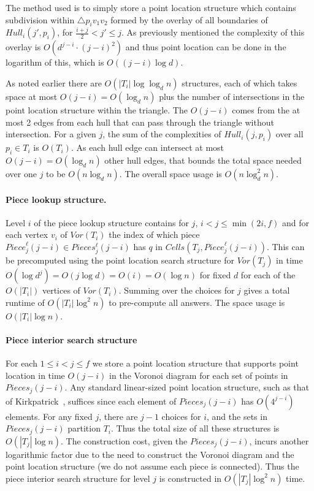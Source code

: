 \documentclass[10pt,a4paper]{amsart}
\newcommand{\Cells}{\mathit{Cells}}
\newcommand{\Piece}{\mathit{Piece}}
\newcommand{\Pieces}{\mathit{Pieces}}
\newcommand{\Hull}{\mathit{Hull}}
\newcommand{\Voron}{\mathit{Vor}}
\begin{document}
The method used is to simply store a point location structure which contains subdivision within $\triangle p_iv_1v_2$ formed by the overlay of all boundaries of $\Hull_i(j',p_i)$, for $\frac{i+j}{2}< j'\leq j$. As previously mentioned the complexity of this overlay is $O(d^{j-i}\cdot(j-i)^{2})$ and thus point location can be done in the logarithm of this, which is $O((j-i)\log d)$.

 As noted earlier there are $O(|T_i| \log \log_d n)$ structures, each of which takes space at most $O(j-i)=O(\log_d n)$ plus the number of intersections in the point location structure within the triangle. The $O(j-i)$ comes from the at most 2 edges from each hull that can pass through the triangle without intersection.  For a given $j$, the sum of the complexities of $\Hull_i(j,p_i)$ over all $p_i \in T_i$ is $O(T_i)$. As each hull edge can intersect at most $O(j-i)= O(\log_d n)$ other hull edges, that bounds the total space needed over one $j$ to be $O(n \log_d n)$. The overall space usage is $O(n\log_d^2 n)$.


\paragraph*{Piece lookup structure.}
Level $i$ of the piece lookup structure contains for $j$, $i<j\leq \min(2i,f)$ and for each vertex $v_i$ of $\Voron(T_i)$ the index of which piece $\Piece^\ell_j(j-i) \in Pieces^\ell_j(j-i)$ has $q$ in $\Cells(T_j,\Piece^\ell_j(j-i))$. This can be precomputed using the point location search structure for $\Voron(T_j)$ in time $O(\log d^j)=O(j \log d)=O(i)=O(\log n)$ for fixed $d$ for each of the $O(|T_i|)$ vertices of  $\Voron(T_i)$. Summing over the choices for $j$ gives a total runtime of  $O(|T_i|\log^2 n)$ to pre-compute all answers. The space usage is $O(|T_i|\log n)$.


\paragraph*{Piece interior search structure} For each $1\leq i < j \leq f$ we store a point location structure that supports point location in time $O(j-i)$ in the Voronoi diagram for each set of points in $\Pieces_j(j-i)$. Any standard linear-sized point location structure, such as that of Kirkpatrick~\cite{Kirkpatrick83}, suffices since each element of $\Pieces_j(j-i)$ has $O(4^{j-i})$ elements. For any fixed $j$, there are $j-1$ choices for $i$, and the sets in $\Pieces_j(j-i)$ partition $T_i$. Thus the total size of all these structures is $O(|T_j| \log n)$. The construction cost, given the $\Pieces_j(j-i)$, incurs another logarithmic factor due to the need to construct the Voronoi diagram and the point location structure (we do not assume each piece is connected). Thus the piece  interior search structure for level $j$ is constructed in $O(|T_j|\log^2 n)$ time. 
\end{document}
